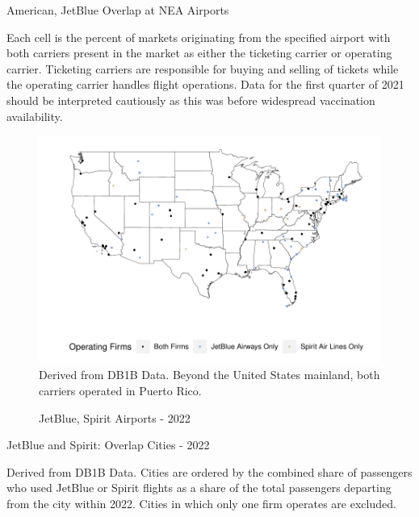 \documentclass{article}
\begin{document}
\begin{table}[h]
		\caption{American, JetBlue Overlap at NEA Airports}
		\label{tab:NEA_Airport_Presence}
        \vspace{-15mm}
        \begin{center}
         
        \end{center}
                \vspace{-5mm}
		\footnotesize{Each cell is the percent of markets originating from the specified airport with both carriers present in the market as either the ticketing carrier or operating carrier. Ticketing carriers are responsible for buying and selling of tickets while the operating carrier handles flight operations. Data for the first quarter of 2021 should be interpreted cautiously as this was before widespread vaccination availability.}
\end{table}

\begin{figure}
	\caption{JetBlue, Spirit Airports - 2022}
	\label{fig:JBSpirit_Airports_2022}
	\includegraphics[width = \linewidth]{Map_Mainland_Both_2022.pdf}
	\footnotesize{Derived from DB1B Data. Beyond the United States mainland, both carriers operated in Puerto Rico.}
\end{figure}


	\begin{table}
		\caption{JetBlue and Spirit: Overlap Cities - 2022}
		\label{tab:KeyCities}
		
		\footnotesize{Derived from DB1B Data. Cities are ordered by the combined share of passengers who used JetBlue or Spirit flights as a share of the total passengers departing from the city within 2022. Cities in which only one firm operates are excluded.}
	\end{table}
\end{document}
